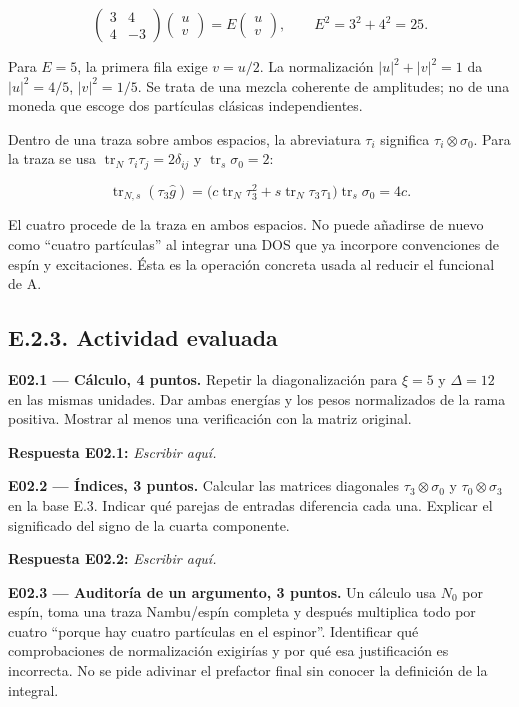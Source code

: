 \documentclass[
  spanish,
  10pt,
  a4paper,
]{article}
\begin{document}
\[
\begin{pmatrix}3&4\\4&-3\end{pmatrix}
\begin{pmatrix}u\\v\end{pmatrix}
=E\begin{pmatrix}u\\v\end{pmatrix},\qquad
E^2=3^2+4^2=25.
\tag{E.5}
\]

Para \(E=5\), la primera fila exige \(v=u/2\). La normalización
\(|u|^2+|v|^2=1\) da \(|u|^2=4/5\), \(|v|^2=1/5\). Se trata de una
mezcla coherente de amplitudes; no de una moneda que escoge dos
partículas clásicas independientes.

Dentro de una traza sobre ambos espacios, la abreviatura \(\tau_i\)
significa \(\tau_i\otimes\sigma_0\). Para la traza se usa
\(\operatorname{tr}_N\tau_i\tau_j=2\delta_{ij}\) y
\(\operatorname{tr}_s\sigma_0=2\):

\[
\operatorname{tr}_{N,s}(\tau_3\hat g)
=\big(c\operatorname{tr}_N\tau_3^2+s\operatorname{tr}_N\tau_3\tau_1\big)
\operatorname{tr}_s\sigma_0=4c.
\tag{E.6}
\]

El cuatro procede de la traza en ambos espacios. No puede añadirse de
nuevo como ``cuatro partículas'' al integrar una DOS que ya incorpore
convenciones de espín y excitaciones. Ésta es la operación concreta
usada al reducir el funcional de A.

\subsection{E.2.3. Actividad evaluada}\label{e.2.3.-actividad-evaluada}

\textbf{E02.1 --- Cálculo, 4 puntos.} Repetir la diagonalización para
\(\xi=5\) y \(\Delta=12\) en las mismas unidades. Dar ambas energías y
los pesos normalizados de la rama positiva. Mostrar al menos una
verificación con la matriz original.

\textbf{Respuesta E02.1:} \emph{Escribir aquí.}

\textbf{E02.2 --- Índices, 3 puntos.} Calcular las matrices diagonales
\(\tau_3\otimes\sigma_0\) y \(\tau_0\otimes\sigma_3\) en la base E.3.
Indicar qué parejas de entradas diferencia cada una. Explicar el
significado del signo de la cuarta componente.

\textbf{Respuesta E02.2:} \emph{Escribir aquí.}

\textbf{E02.3 --- Auditoría de un argumento, 3 puntos.} Un cálculo usa
\(N_0\) por espín, toma una traza Nambu/espín completa y después
multiplica todo por cuatro ``porque hay cuatro partículas en el
espinor''. Identificar qué comprobaciones de normalización exigirías y
por qué esa justificación es incorrecta. No se pide adivinar el
prefactor final sin conocer la definición de la integral.
\end{document}
